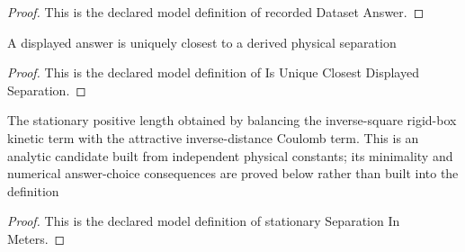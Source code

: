 \begin{proof}
  This is the declared model definition of recorded Dataset Answer.
\end{proof}
\begin{definition}
  \label{def:physics:phyx-mini-0535:phyxminiproblems-problemphyxmini0535-isuniqueclosestdisplayedseparation}
  A displayed answer is uniquely closest to a derived physical separation
\end{definition}
\begin{proof}
  This is the declared model definition of Is Unique Closest Displayed Separation.
\end{proof}
\begin{definition}
  \label{def:physics:phyx-mini-0535:phyxminiproblems-problemphyxmini0535-stationaryseparationinmeters}
  The stationary positive length obtained by balancing the inverse-square rigid-box kinetic term with the attractive inverse-distance Coulomb term. This is an analytic candidate built from independent physical constants; its minimality and numerical answer-choice consequences are proved below rather than built into the definition
\end{definition}
\begin{proof}
  This is the declared model definition of stationary Separation In Meters.
\end{proof}
